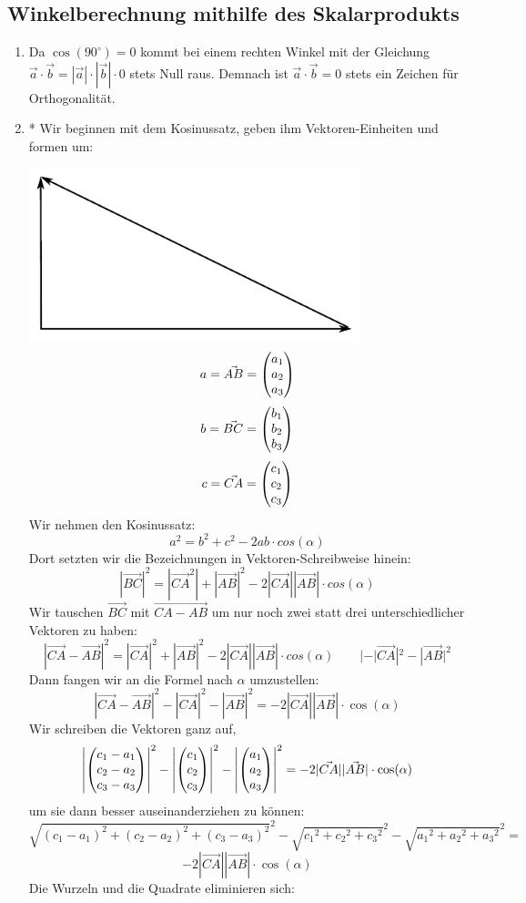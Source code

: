 \subsection{Winkelberechnung mithilfe des Skalarprodukts}
	\begin{enumerate}
		\item Da $\cos(90^\circ)=0$ kommt bei einem rechten Winkel mit der Gleichung $\vec{a}\cdot\vec{b}=|\vec{a}|\cdot|\vec{b}|\cdot0 $ stets Null raus. Demnach ist $\vec{a}\cdot\vec{b} = 0$ stets ein Zeichen für Orthogonalität.

		\item * Wir beginnen mit dem Kosinussatz, geben ihm Vektoren-Einheiten und formen um:
		
		{\includegraphics [keepaspectratio,height=5cm]{pics/Dreieck}}
		$$a=\vec{AB}=\begin{pmatrix} a_1 \\ a_2 \\ a_3 \end{pmatrix}$$			$$b=\vec{BC}=\begin{pmatrix} b_1 \\ b_2 \\ b_3 \end{pmatrix}$$
		$$c=\vec{CA}=\begin{pmatrix} c_1 \\ c_2 \\ c_3 \end{pmatrix}$$\newline\newline
Wir nehmen den Kosinussatz:				
		$$ a^2=b^2+c^2-2ab\cdot cos(\alpha)$$
Dort setzten wir die Bezeichnungen in Vektoren-Schreibweise hinein:	
		$$ |\vec{BC}|^2=|\vec{CA}^2|+|\vec{AB}|^2-2|\vec{CA}||\vec{AB}|\cdot cos(\alpha) $$
Wir tauschen $\vec{BC}$ mit $\vec{CA-AB}$ um nur noch zwei statt drei unterschiedlicher Vektoren zu haben:	
		$$|\vec{CA}-\vec{AB}|^2=|\vec{CA}|^2+|\vec{AB}|^2-2|\vec{CA}||\vec{AB}|\cdot cos(\alpha) \qquad |-|\vec{CA}|^2-|\vec{AB}|^2 $$
Dann fangen wir an die Formel nach $\alpha$ umzustellen:	
		$$|\vec{CA}-\vec{AB}|^2-|\vec{CA}|^2-|\vec{AB}|^2=-2|\vec{CA}||\vec{AB}|\cdot \cos(\alpha) $$
Wir schreiben die Vektoren ganz auf,	
		$$\left|\begin{pmatrix} c_1-a_1 \\ c_2-a_2 \\ c_3-a_3 \end{pmatrix}\right|^2-\left|\begin{pmatrix} c_1 \\ c_2 \\ c_3 \end{pmatrix}\right|^2-\left|\begin{pmatrix} a_1 \\ a_2 \\ a_3 \end{pmatrix}\right|^2=-2|\vec{CA}||\vec{AB}| \cdot \cos(\alpha) $$
um sie dann besser auseinanderziehen zu können:	
		$$\sqrt{(c_1-a_1)^2+(c_2-a_2)^2+(c_3-a_3)^2}^2-\sqrt{{c_1}^2+{c_2}^2+{c_3}^2}^2-\sqrt{{a_1}^2+{a_2}^2+{a_3}^2}^2=$$
		$$-2|\vec{CA}||\vec{AB}|\cdot \cos(\alpha) $$
Die Wurzeln und die Quadrate eliminieren sich:	

\end{enumerate}
